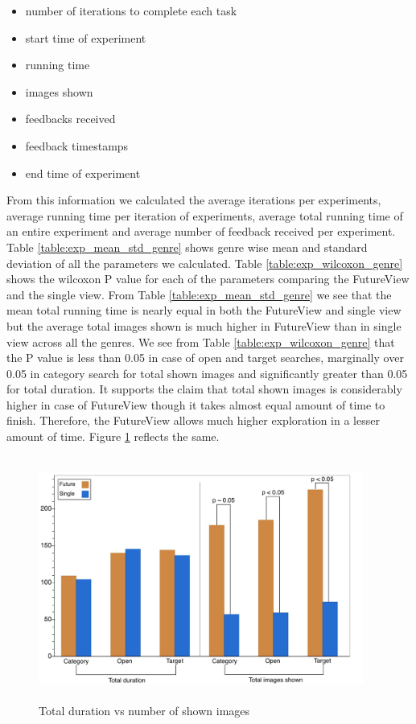 \documentclass[english]{tktltiki}
\begin{document}
\begin{itemize}
	\item number of iterations to complete each task
	\item start time of experiment
	\item running time
	\item images shown
	\item feedbacks received
	\item feedback timestamps
	\item end time of experiment
\end{itemize}

From this information we calculated the average iterations per experiments, average running time per iteration of experiments, average total running time of an entire experiment and average number of feedback received per experiment. Table \ref{table:exp_mean_std_genre} shows genre wise mean and standard deviation of all the parameters we calculated. Table \ref{table:exp_wilcoxon_genre} shows the wilcoxon P value for each of the parameters comparing the FutureView and the single view. From Table \ref{table:exp_mean_std_genre} we see that the mean total running time is nearly equal in both the FutureView and single view but the average total images shown is much higher in FutureView than in single view across all the genres. We see from Table \ref{table:exp_wilcoxon_genre} that the P value is less than 0.05 in case of open and target searches, marginally over 0.05 in category search for total shown images and significantly greater than 0.05 for total duration. It supports the claim that total shown images is considerably higher in case of FutureView though it takes almost equal amount of time to finish. Therefore, the FutureView allows much higher exploration in a lesser amount of time. Figure \ref{dur_vs_img} reflects the same.

\begin{figure}[h!]
  \centering
    \includegraphics[width=0.95\textwidth,height=8cm]{figures/Bar_Chart__Duration_vs_Images.jpg}
    \caption{Total duration vs number of shown images}
    \label{dur_vs_img}
\end{figure}
\end{document}

